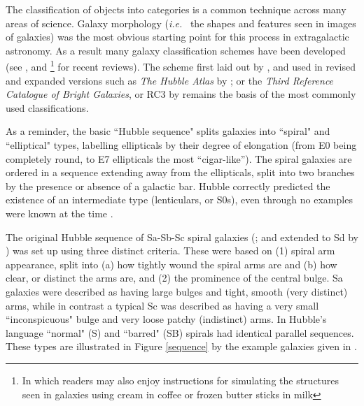 \documentclass[usenatbib]{mn2e}
\newcommand{\ie}{{\it i.e.}}
\begin{document}
The classification of objects into categories is a common technique across many areas of science. Galaxy morphology (\ie~ the shapes and features seen in images of galaxies) was the most obvious starting point for this process in extragalactic astronomy. %
As a result many galaxy classification schemes have been developed (see \citealt{Buta2013}, and \citealt{Sandage2005}\footnote{In which readers may also enjoy instructions for simulating the structures seen in galaxies using cream in coffee or frozen butter sticks in milk} for recent reviews).
The scheme first laid out by \citet{Hubble1926,Hubble1936}, and used in revised and expanded versions such as {\it The Hubble Atlas} by \citet{Sandage1961}; or the {\it Third Reference Catalogue of Bright Galaxies}, or RC3 by \citealt{1991rc3..book.....D} remains the basis of the most commonly used classifications. 

As a reminder, the basic ``Hubble sequence" splits galaxies into ``spiral" and ``elliptical" types, labelling ellipticals by their degree of elongation (from E0 being completely round, to E7 ellipticals the most ``cigar-like''). The spiral galaxies are ordered in a sequence extending away from the ellipticals, split into two branches by the presence or absence of a galactic bar. 
Hubble correctly predicted the existence of an intermediate type (lenticulars, or S0s), even through no examples were known at the time \citep{Buta2013}. 

The original Hubble sequence of Sa-Sb-Sc spiral galaxies (\citealt{Hubble1926}; and extended to Sd by \citealt{1959HDP....53..275D}) was set up using three distinct criteria. These were based on (1) spiral arm appearance, split into (a) how tightly wound the spiral arms are and (b) how clear, or distinct the arms are, and (2) the prominence of the central bulge. Sa galaxies were described as having large bulges and tight, smooth (very distinct) arms, while in contrast a typical Sc was described as having a very small ``inconspicuous" bulge and very loose patchy (indistinct) arms. In Hubble's language ``normal" (S) and ``barred" (SB) spirals had identical parallel sequences. These types are illustrated in Figure \ref{sequence} by the example galaxies given in \citet{Hubble1926}. 
\end{document}
